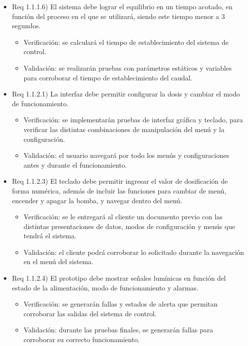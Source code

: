 \documentclass[
11pt, %
]{charter}
\begin{document}
\begin{itemize}
\item Req 1.1.1.6) El sistema debe lograr el equilibrio en un tiempo acotado, en función del proceso en el que se utilizará, siendo este tiempo menor a 3 segundos.

\begin{itemize}
	\item Verificación: se calculará el tiempo de establecimiento del sistema de control.
	\item Validación: se realizarán pruebas con parámetros estáticos y variables para corroborar el tiempo de establecimiento del caudal.
\end{itemize}

\item Req 1.1.2.1) La interfaz debe permitir configurar la dosis y cambiar el modo de funcionamiento.

\begin{itemize}
	\item Verificación: se implementarán pruebas de interfaz gráfica y teclado, para verificar las distintas combinaciones de manipulación del menú y la configuración.
	\item Validación: el usuario navegará por todo los menús y configuraciones antes y durante el funcionamiento.
\end{itemize}

\item Req 1.1.2.3) El teclado debe permitir ingresar el valor de dosificación de forma numérica, además de incluir las funciones para cambiar de menú, encender y apagar la bomba, y navegar dentro del menú.

\begin{itemize}
	\item Verificación: se le entregará al cliente un documento previo con las distintas presentaciones de datos, modos de configuración y menús que tendrá el sistema.
	\item Validación: el cliente podrá corroborar lo solicitado durante la navegación en el menú del sistema.
\end{itemize}

\item Req 1.1.2.4) El prototipo debe mostrar señales lumínicas en función del estado de la alimentación, modo de funcionamiento y alarmas.

\begin{itemize}
	\item Verificación: se generarán fallas y estados de alerta que permitan corroborar las salidas del sistema de control.
	\item Validación: durante las pruebas finales, se generarán fallas para corroborar su correcto funcionamiento.
\end{itemize}


\end{itemize}
\end{document}
